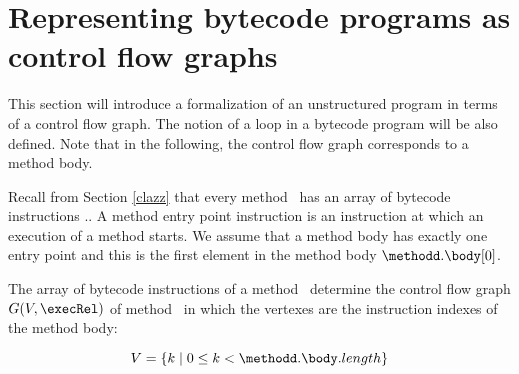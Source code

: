 \newtheorem{defEdge}{Definition}[section]
\newtheorem{defLoop}[defEdge]{Definition}

\newtheorem{defInv}[defEdge]{Definition}
\newtheorem{defModif}[defEdge]{Definition}

\newtheorem{propPath}{Lemma}[section]

\section{Representing bytecode programs as control flow graphs}\label{prelim:ctrFlow}

This section will introduce a formalization of an unstructured program in terms of a control flow graph.
The notion of a loop in a bytecode program will be also defined. Note that in the following,
the control flow graph corresponds to a method body. 


Recall from Section \ref{clazz} that every method \methodd \ has an array of bytecode instructions \methodd.\body.
 A method entry point instruction is  an instruction at which an execution of a method starts.
 We assume that a method body has exactly one entry point
 and this is the first element in the method body $\methodd.\body[0]$.

 The array of bytecode instructions of a method \methodd \ determine the control flow graph $G( V , \execRel ) $   of method \methodd \ 
in which the vertexes are the instruction indexes of the method body:

$$ V = \{ k \mid   0 \leq k < \methodd.\body.length  \}$$


